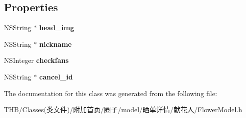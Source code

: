 \subsection*{Properties}
\begin{DoxyCompactItemize}
\item 
\mbox{\label{interface_flower_model_a33f123b8526c488dfbb9dcd2db9cf5cf}} 
N\+S\+String $\ast$ {\bfseries head\+\_\+img}
\item 
\mbox{\label{interface_flower_model_a698cfa8f32b061491037b249495a0efc}} 
N\+S\+String $\ast$ {\bfseries nickname}
\item 
\mbox{\label{interface_flower_model_a35a2f4b95a28b4e8cf45bf03257c88bf}} 
N\+S\+Integer {\bfseries checkfans}
\item 
\mbox{\label{interface_flower_model_a2829d5485762c9e3bc25bbad1e3b189b}} 
N\+S\+String $\ast$ {\bfseries cancel\+\_\+id}
\end{DoxyCompactItemize}


The documentation for this class was generated from the following file\+:\begin{DoxyCompactItemize}
\item 
T\+H\+B/\+Classes(类文件)/附加首页/圈子/model/晒单详情/献花人/Flower\+Model.\+h\end{DoxyCompactItemize}
